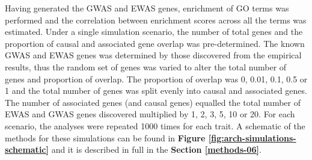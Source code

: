 \documentclass[11pt,twoside]{bristolthesis}
\begin{document}
Having generated the GWAS and EWAS genes, enrichment of GO terms was performed and the correlation between enrichment scores across all the terms was estimated. Under a single simulation scenario, the number of total genes and the proportion of causal and associated gene overlap was pre-determined. The known GWAS and EWAS genes was determined by those discovered from the empirical results, thus the random set of genes was varied to alter the total number of genes and proportion of overlap. The proportion of overlap was 0, 0.01, 0.1, 0.5 or 1 and the total number of genes was split evenly into causal and associated genes. The number of associated genes (and causal genes) equalled the total number of EWAS and GWAS genes discovered multiplied by 1, 2, 3, 5, 10 or 20. For each scenario, the analyses were repeated 1000 times for each trait. A schematic of the methods for these simulations can be found in \textbf{Figure \ref{fig:arch-simulations-schematic}} and it is described in full in the \textbf{Section \ref{methods-06}}.
\end{document}
